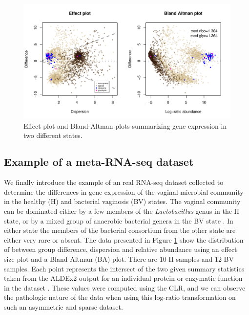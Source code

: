 \documentclass[10pt]{article}
\begin{document}
\begin{figure}[ht]
\includegraphics[width=5in]{twtyfr.pdf}
\caption{Effect plot and Bland-Altman plots summarizing gene expression in two different states. }
\label{Fig:bv}
\end{figure}


\subsection{Example of a meta-RNA-seq dataset}
\vskip-0.25cm We finally introduce the example of an real RNA-seq dataset collected to determine the differences in gene expression of the vaginal microbial community in the healthy (H) and bacterial vaginosis (BV) states. The vaginal community can be dominated either by a few members of the \textit{Lactobacillus} genus in the H state, or by a mixed group of anaerobic bacterial genera in the BV state . In either state the members of the bacterial consortium from the other state are either very rare or absent. The data presented in Figure \ref{Fig:bv} show the distribution of between group difference, dispersion and relative abundance using an effect size plot  and a Bland-Altman (BA) plot. There are 10 H samples and 12 BV samples. Each point represents the intersect of the two given summary statistics taken from the ALDEx2 output for an individual protein or enzymatic function in the dataset . These values were computed using the CLR, and we can observe the pathologic nature of the data when using this log-ratio transformation on such an asymmetric and sparse dataset. 
\end{document}
